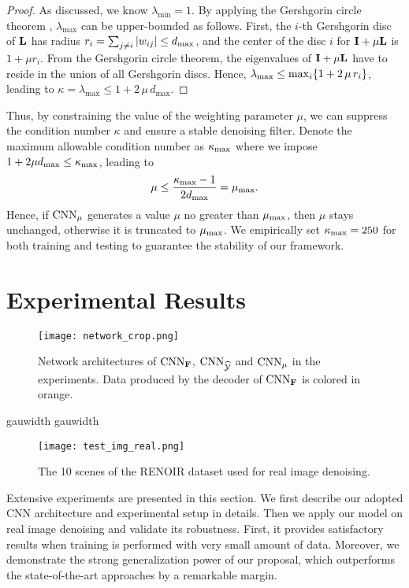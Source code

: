 \documentclass[10pt,twocolumn,letterpaper]{article}
\newcommand{\deflen}[2]{%
    \expandafter\newlength\csname #1\endcsname
    \expandafter\setlength\csname #1\endcsname{#2}%
}
\begin{document}
\begin{proof}
As discussed, we know $\lambda_{\min}=1$. 
By applying the Gershgorin circle theorem \cite{varga2010gervsgorin}, $\lambda_{\max}$ can be upper-bounded as follows. 
First, the $i$-th Gershgorin disc of $\bf{L}$ has radius $r_i = \sum\nolimits_{j \neq i} |w_{ij}| \le d_{\rm max}$, and the center of the disc $i$ for ${\bf I} + \mu{\bf L}$ is $1+\mu r_i$. 
From the Gershgorin circle theorem, the eigenvalues of ${\bf I} + \mu{\bf L}$ have to reside in the union of all Gershgorin discs. 
Hence, $\lambda_{\rm max} \le \max_{i} \{1 + 2 \, \mu \, r_i\}$, leading to $\kappa = \lambda_{\max} \le 1 + 2 \, \mu \, d_{\max}$.
\end{proof}

Thus, by constraining the value of the weighting parameter $\mu$, we can suppress the condition number $\kappa$ and ensure a stable denoising filter. 
Denote the maximum allowable condition number as $\kappa_{\rm max}$ where we impose $1+2\mu d_{\rm max}\le \kappa_{\max}$, leading to
\begin{equation}
\mu \le \frac{\kappa_{\rm max} - 1}{2d_{\rm max}}=\mu_{\rm max}.
\end{equation}
Hence, if ${\rm CNN}_{\mu}$ generates a value $\mu$ no greater than $\mu_{\rm max}$, then $\mu$ stays unchanged, otherwise it is truncated to $\mu_{\rm max}$. 
We empirically set $\kappa_{\rm max}=250$ for both training and testing to guarantee the stability of our framework. 


\section{Experimental Results}\label{sec:results}
\begin{figure*}[t]
\centering
    \texttt{[image: network\_crop.png]}
\caption{Network architectures of ${\rm CNN}_{\bf F}$, ${\rm CNN}_{\widehat{\cal Y}}$ and ${\rm CNN}_{\mu}$ in the experiments. Data produced by the decoder of ${\rm CNN}_{\bf F}$ is colored in orange. }
\label{fig:network}
\end{figure*}
\deflen{gauwidth}{82pt}
\begin{figure*}[t]
\centering
    \texttt{[image: test\_img\_real.png]}
\caption{The 10 scenes of the RENOIR dataset \cite{anaya2018renoir} used for real image denoising.}
\label{fig:realall}
\end{figure*}

Extensive experiments are presented in this section. 
We first describe our adopted CNN architecture and experimental setup in details. 
Then we apply our model on real image denoising and validate its robustness.
First, it provides satisfactory results when training is performed with very small amount of data.
Moreover, we demonstrate the strong generalization power of our proposal, which outperforms the state-of-the-art approaches by a remarkable margin. 
\end{document}
